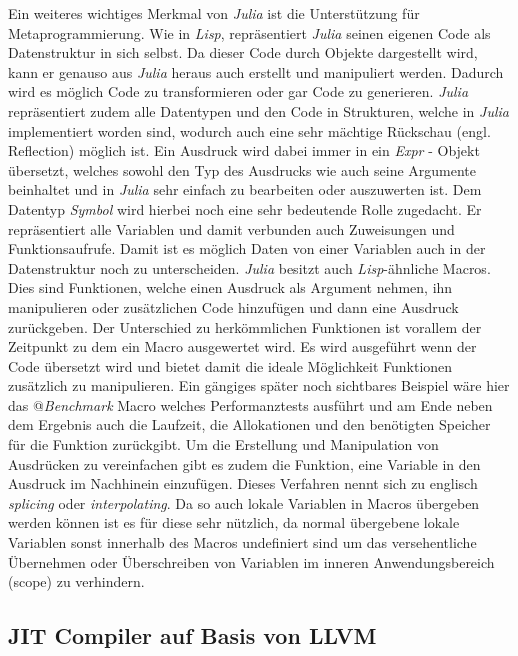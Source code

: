 \documentclass[proseminar,german,utf8]{zihpub}
\begin{document}
Ein weiteres wichtiges Merkmal von \textit{Julia} ist die Unterstützung für Metaprogrammierung. Wie in \textit{Lisp}, repräsentiert \textit{Julia} seinen eigenen Code als Datenstruktur in sich selbst. Da dieser Code durch Objekte dargestellt wird, kann er genauso aus \textit{Julia} heraus auch erstellt und manipuliert werden. Dadurch wird es möglich Code zu transformieren oder gar Code zu generieren. \textit{Julia} repräsentiert zudem alle Datentypen und den Code in Strukturen, welche in \textit{Julia} implementiert worden sind, wodurch auch eine sehr mächtige Rückschau (engl. Reflection) möglich ist. Ein Ausdruck wird dabei immer in ein \textit{Expr} - Objekt übersetzt, welches sowohl den Typ des Ausdrucks wie auch seine Argumente beinhaltet und in \textit{Julia} sehr einfach zu bearbeiten oder auszuwerten ist. Dem Datentyp \textit{Symbol} wird hierbei noch eine sehr bedeutende Rolle zugedacht. Er repräsentiert alle Variablen und damit verbunden auch Zuweisungen und Funktionsaufrufe. Damit ist es möglich Daten von einer Variablen auch in der Datenstruktur noch zu unterscheiden. \textit{Julia} besitzt auch \textit{Lisp}-ähnliche Macros. Dies sind Funktionen, welche einen Ausdruck als Argument nehmen, ihn manipulieren oder zusätzlichen Code hinzufügen und dann eine Ausdruck zurückgeben. Der Unterschied zu herkömmlichen Funktionen ist vorallem der Zeitpunkt zu dem ein Macro ausgewertet wird. Es wird ausgeführt wenn der Code übersetzt wird und bietet damit die ideale Möglichkeit Funktionen zusätzlich zu manipulieren. Ein gängiges später noch sichtbares Beispiel wäre hier das @\textit{Benchmark} Macro welches Performanztests ausführt und am Ende neben dem Ergebnis auch die Laufzeit, die Allokationen und den benötigten Speicher für die Funktion zurückgibt. Um die Erstellung und Manipulation von Ausdrücken zu vereinfachen gibt es zudem die Funktion, eine Variable in den Ausdruck im Nachhinein einzufügen. Dieses Verfahren nennt sich zu englisch \textit{splicing} oder \textit{interpolating}. Da so auch lokale Variablen in Macros übergeben werden können ist es für diese sehr nützlich, da normal übergebene lokale Variablen sonst innerhalb des Macros undefiniert sind um das versehentliche Übernehmen oder Überschreiben von Variablen im inneren Anwendungsbereich (scope) zu verhindern.

\subsection{JIT Compiler auf Basis von LLVM}
\end{document}

